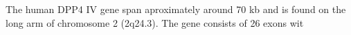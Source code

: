 The human DPP4 IV gene span aproximately around 70 kb and is found on the long arm of chromosome 2 (2q24.3). The gene consists of 26 exons wit